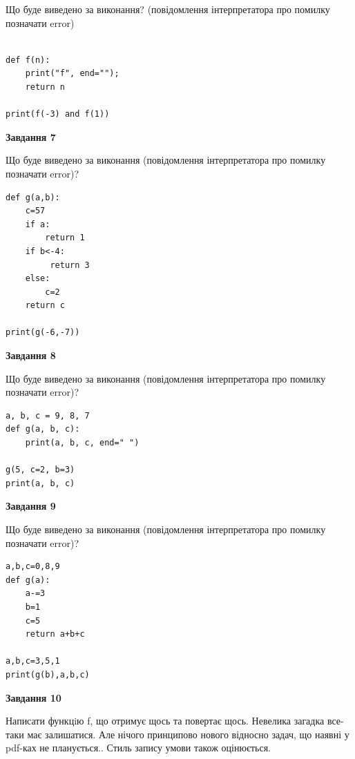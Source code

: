 \documentclass[12pt, ukrainian]{article}
\begin{document}
{\begin {large}
Що буде виведено за виконання? (повідомлення інтерпретатора про помилку позначати error)\par
\begin{verbatim}

def f(n):
    print("f", end="");
    return n

print(f(-3) and f(1))
\end{verbatim}

{\begin {center}\textbf{Завдання 7}\end {center}}

Що буде виведено за виконання (повідомлення інтерпретатора про помилку позначати error)?\par
\begin{verbatim}
def g(a,b):
    c=57
    if a:
        return 1
    if b<-4:
         return 3
    else: 
        c=2
    return c

print(g(-6,-7))
\end{verbatim}

{\begin {center}\textbf{Завдання 8}\end {center}}

Що буде виведено за виконання (повідомлення інтерпретатора про помилку позначати error)?\par
\begin{verbatim}
a, b, c = 9, 8, 7
def g(a, b, c):
    print(a, b, c, end=" ")

g(5, c=2, b=3)
print(a, b, c)
\end{verbatim}

{\begin {center}\textbf{Завдання 9}\end {center}}

Що буде виведено за виконання (повідомлення інтерпретатора про помилку позначати error)?\par
\begin{verbatim}
a,b,c=0,8,9
def g(a):
    a-=3
    b=1
    c=5
    return a+b+c

a,b,c=3,5,1
print(g(b),a,b,c)
\end{verbatim}

{\begin {center}\textbf{Завдання 10}\end {center}}


Написати функцiю f, що отримує щось та повертає щось. Невелика загадка все-таки має залишатися. Але нічого принципово нового відносно задач, що наявні у pdf-ках не планується.. Стиль запису умови також оцінюється.\par
\end {large}}
\newpage
\end{document}

